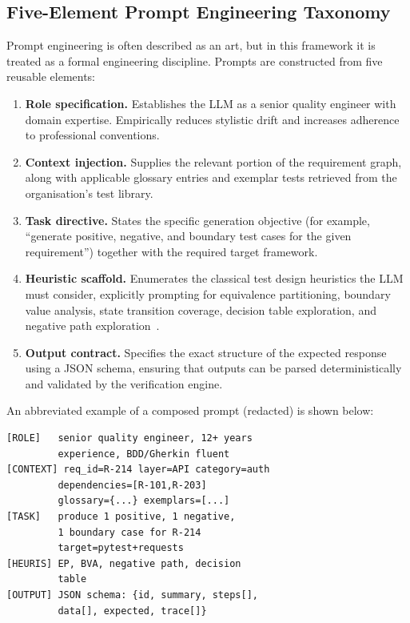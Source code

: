\documentclass[conference]{IEEEtran}
\begin{document}
\subsection{Five-Element Prompt Engineering Taxonomy}

Prompt engineering is often described as an art, but in this framework it is treated as a formal engineering discipline. Prompts are constructed from five reusable elements:

\begin{enumerate}
\item \textbf{Role specification.} Establishes the LLM as a senior quality engineer with domain expertise. Empirically reduces stylistic drift and increases adherence to professional conventions.
\item \textbf{Context injection.} Supplies the relevant portion of the requirement graph, along with applicable glossary entries and exemplar tests retrieved from the organisation's test library.
\item \textbf{Task directive.} States the specific generation objective (for example, ``generate positive, negative, and boundary test cases for the given requirement'') together with the required target framework.
\item \textbf{Heuristic scaffold.} Enumerates the classical test design heuristics the LLM must consider, explicitly prompting for equivalence partitioning, boundary value analysis, state transition coverage, decision table exploration, and negative path exploration~\cite{beizer1990,myers2011}.
\item \textbf{Output contract.} Specifies the exact structure of the expected response using a JSON schema, ensuring that outputs can be parsed deterministically and validated by the verification engine.
\end{enumerate}

An abbreviated example of a composed prompt (redacted) is shown below:

\begin{lstlisting}
[ROLE]   senior quality engineer, 12+ years
         experience, BDD/Gherkin fluent
[CONTEXT] req_id=R-214 layer=API category=auth
         dependencies=[R-101,R-203]
         glossary={...} exemplars=[...]
[TASK]   produce 1 positive, 1 negative,
         1 boundary case for R-214
         target=pytest+requests
[HEURIS] EP, BVA, negative path, decision
         table
[OUTPUT] JSON schema: {id, summary, steps[],
         data[], expected, trace[]}
\end{lstlisting}
\end{document}
